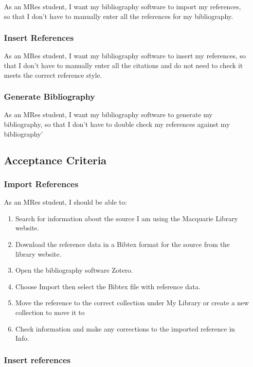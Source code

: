 \documentclass{article}
\begin{document}
As an MRes student, I want my bibliography software to import my references, so that I don’t have to manually enter all the references for my bibliography.

\subsubsection*{Insert References}

As an MRes student, I want my bibliography software to insert my references, so that I don’t have to manually enter all the citations and do not need to check it meets the correct reference style.

\subsubsection*{Generate Bibliography}

As an MRes student, I want my bibliography software to generate my bibliography, so that I don’t have to double check my references against my bibliography’

\subsection*{Acceptance Criteria}

\subsubsection*{Import References}

As an MRes student, I should be able to:
\begin{enumerate} 
\item Search for information about the source I am using the Macquarie Library website. 
\item Download the reference data in a Bibtex format for the source from the library website. 
\item Open the bibliography software Zotero. 
\item Choose Import then select the Bibtex file with reference data. 
\item Move the reference to the correct collection under My Library or create a new collection to move it to
\item Check information and make any corrections to the imported reference in Info.
\end{enumerate} 

\subsubsection*{Insert references}
\end{document}
